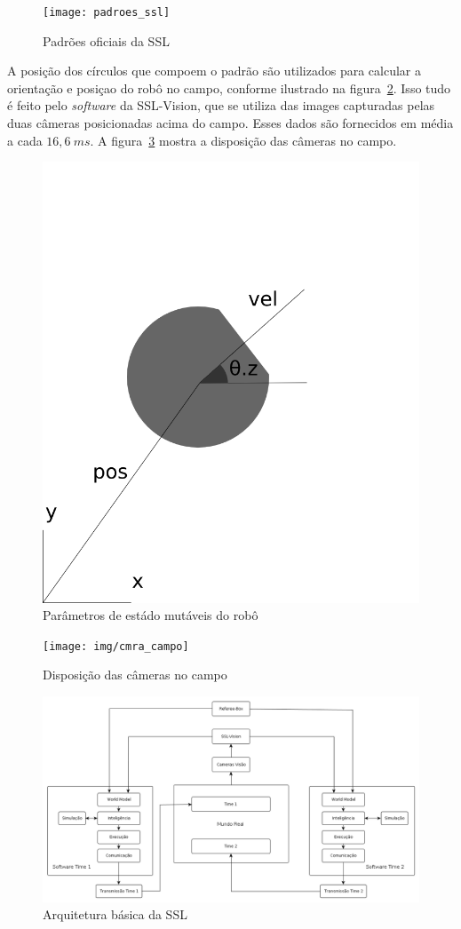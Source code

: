 \begin{figure}[thpb]
  \centering
  \texttt{[image: padroes\_ssl]}
  \caption{Padrões oficiais da SSL~\cite{zickler-ssl}}\label{fig:padroes_ssl}
\end{figure}

A posição dos círculos que compoem o padrão são utilizados para calcular a orientação
e posiçao do robô no campo, conforme ilustrado na figura~\ref{fig:rob_data}. Isso
tudo é feito pelo \textit{software} da SSL-Vision, que se utiliza das images capturadas
pelas duas câmeras posicionadas acima do campo. Esses dados são fornecidos em média a
cada $16,6{\ }ms$. A figura~\ref{fig:cmra_campo} mostra a disposição das câmeras no
campo.

\begin{figure}[thpb]
  \centering
  \includegraphics[width=0.5\linewidth]{img/rob_data}
  \caption{Parâmetros de estádo mutáveis do robô}\label{fig:rob_data}
\end{figure}

\begin{figure}[thpb]
  \centering
  \texttt{[image: img/cmra\_campo]}
  \caption{Disposição das câmeras no campo}\label{fig:cmra_campo}
\end{figure}

\begin{landscape}
  \begin{figure}[thpb]
    \centering
    \includegraphics[width=20cm]{img/arquitetura_ssl}
    \caption{Arquitetura básica da SSL}\label{fig:arquitetura_ssl}
  \end{figure}
\end{landscape}

